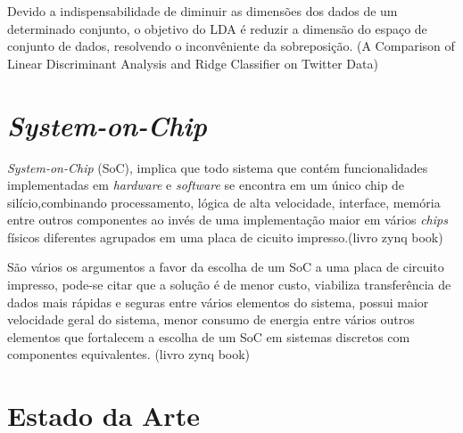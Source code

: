 Devido a indispensabilidade de diminuir as dimensões dos dados de um determinado conjunto, o objetivo do LDA
é reduzir a dimensão do espaço de conjunto de dados, resolvendo o inconvêniente da sobreposição.  
(A Comparison of Linear Discriminant Analysis and Ridge Classifier on Twitter Data)



\section{\textit{System-on-Chip}}

\textit{System-on-Chip} (SoC), implica que todo sistema que
contém funcionalidades implementadas em \textit{hardware}
e \textit{software} se encontra em um único chip de silício,combinando processamento, lógica de
alta velocidade, interface, memória entre outros componentes ao invés de 
uma implementação maior em vários \textit{chips} físicos diferentes agrupados em uma placa 
de cicuito impresso.(livro zynq book)


São vários os argumentos a favor da escolha de um SoC a uma placa de circuito impresso, pode-se
citar que a solução é de menor custo, viabiliza transferência de dados mais rápidas e seguras entre
vários elementos do sistema, possui maior velocidade geral do sistema, menor consumo de energia entre
vários outros elementos que fortalecem a escolha de um SoC em sistemas discretos com componentes
equivalentes. (livro zynq book)


\section{Estado da Arte}



